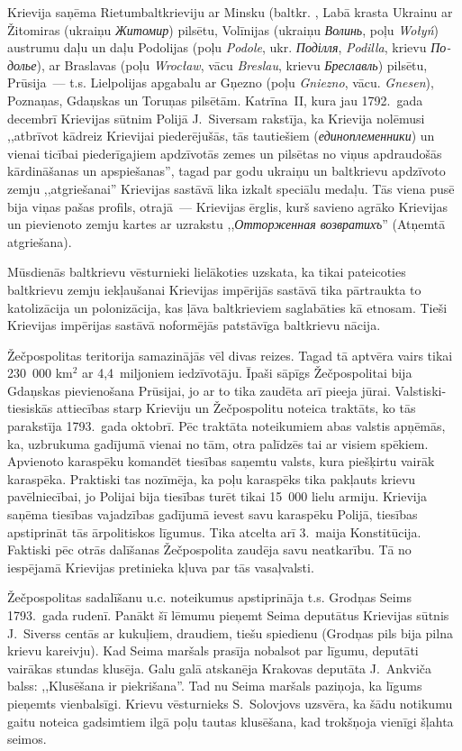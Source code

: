 \documentclass[twoside,a5paper,12pt,fleqn,openany]{extbook}
\newcommand{\pltxti}[1]{\textit{\textpolish{#1}}}
\newcommand{\rutxti}[1]{\textit{\textrussian{#1}}}
\newcommand{\detxti}[1]{\textit{\textgerman{#1}}}
\newcommand{\betxti}[1]{\textit{\textbelarusian{#1}}}
\newcommand{\uktxti}[1]{\textit{\textukrainian{#1}}}
\begin{document}
Krievija saņēma Rietumbaltkrieviju ar Minsku (baltkr. \betxti{Мінск)}, Labā krasta Ukrainu ar Žitomiras (ukraiņu \uktxti{Житомир}) pilsētu, Volīnijas (ukraiņu \uktxti{Волинь}, poļu \pltxti{Wołyń}) austrumu daļu un daļu Podolijas (poļu \pltxti{Podole}, ukr. \uktxti{Поділля}, \uktxti{Podilla}, krievu \rutxti{Подолье}), ar Braslavas (poļu \pltxti{Wrocław}, vācu \detxti{Breslau}, krievu \rutxti{Бреславль}) pilsētu, Prūsija~--- t.s. Lielpolijas apgabalu ar Gņezno (poļu \pltxti{Gniezno}, vācu. \detxti{Gnesen}), Poznaņas, Gdaņskas un Toruņas pilsētām. Katrīna~II, kura jau 1792.~gada decembrī Krievijas sūtnim Polijā J.~Siversam rakstīja, ka Krievija nolēmusi ,,atbrīvot kādreiz Krievijai piederējušās, tās tautiešiem (\rutxti{единоплеменники}) un vienai ticībai piederīgajiem apdzīvotās zemes un pilsētas no viņus apdraudošās kārdināšanas un apspiešanas'', tagad par godu ukraiņu un baltkrievu apdzīvoto zemju ,,atgriešanai'' Krievijas sastāvā lika izkalt speciālu medaļu. Tās viena pusē bija viņas pašas profils, otrajā~--- Krievijas ērglis, kurš savieno agrāko Krievijas un pievienoto zemju kartes ar uzrakstu ,,\rutxti{Отторженная возвратихъ}'' (Atņemtā atgriešana).

Mūsdienās baltkrievu vēsturnieki lielākoties uzskata, ka tikai pateicoties baltkrievu zemju iekļaušanai Krievijas impērijās sastāvā tika pārtraukta to katolizācija un polonizācija, kas ļāva baltkrieviem saglabāties kā etnosam. Tieši Krievijas impērijas sastāvā noformējās patstāvīga baltkrievu nācija.

Žečpospolitas teritorija samazinājās vēl divas reizes. Tagad tā aptvēra vairs tikai 230~000 km$^{2}$ ar 4,4~miljoniem iedzīvotāju. Īpaši sāpīgs Žečpospolitai bija Gdaņskas pievienošana Prūsijai, jo ar to tika zaudēta arī pieeja jūrai. Valstiski-tiesiskās attiecības starp Krieviju un Žečpospolitu noteica traktāts, ko tās parakstīja 1793.~gada oktobrī. Pēc traktāta noteikumiem abas valstis apņēmās, ka, uzbrukuma gadījumā vienai no tām, otra palīdzēs tai ar visiem spēkiem. Apvienoto karaspēku komandēt tiesības saņemtu valsts, kura piešķirtu vairāk karaspēka. Praktiski tas nozīmēja, ka poļu karaspēks tika pakļauts krievu pavēlniecībai, jo Polijai bija tiesības turēt tikai 15~000 lielu armiju. Krievija saņēma tiesības vajadzības gadījumā ievest savu karaspēku Polijā, tiesības apstiprināt tās ārpolitiskos līgumus. Tika atcelta arī 3.~maija Konstitūcija. Faktiski pēc otrās dalīšanas Žečpospolita zaudēja savu neatkarību. Tā no iespējamā Krievijas pretinieka kļuva par tās vasaļvalsti.

Žečpospolitas sadalīšanu u.c. noteikumus apstiprināja t.s. Grodņas Seims 1793.~gada rudenī. Panākt šī lēmumu pieņemt Seima deputātus Krievijas sūtnis J.~Siverss centās ar kukuļiem, draudiem, tiešu spiedienu (Grodņas pils bija pilna krievu kareivju). Kad Seima maršals prasīja nobalsot par līgumu, deputāti vairākas stundas klusēja. Galu galā atskanēja Krakovas deputāta J.~Ankviča balss: ,,Klusēšana ir piekrišana''. Tad nu Seima maršals paziņoja, ka līgums pieņemts vienbalsīgi. Krievu vēsturnieks S.~Solovjovs uzsvēra, ka šādu notikumu gaitu noteica gadsimtiem ilgā poļu tautas klusēšana, kad trokšņoja vienīgi šļahta seimos.
\end{document}
